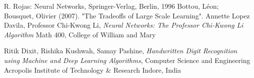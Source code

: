 \documentclass[12pt,a4paper,openright,twoside]{report}
\begin{document}
\begin{thebibliography}{90}             %
\rhead[\fancyplain{}{\bfseries \leftmark}]{\fancyplain{}{\bfseries
\thepage}}
 R. Rojas: Neural Networks, Springer-Verlag, Berlin, 1996
 Bottou, Léon; Bousquet, Olivier (2007). "The Tradeoffs of Large Scale Learning".
 Annette Lopez Davila, Professor Chi-Kwong Li, \emph{Neural Networks: The Professor Chi-Kwong Li Algorithm} Math 400, College of William and Mary

 Ritik Dixit, Rishika Kushwah, Samay Pashine, \emph{Handwritten Digit Recognition using Machine and Deep Learning Algorithms}, Computer Science and Engineering
Acropolis Institute of Technology \& Research
Indore, India
\end{thebibliography}
\end{document}

